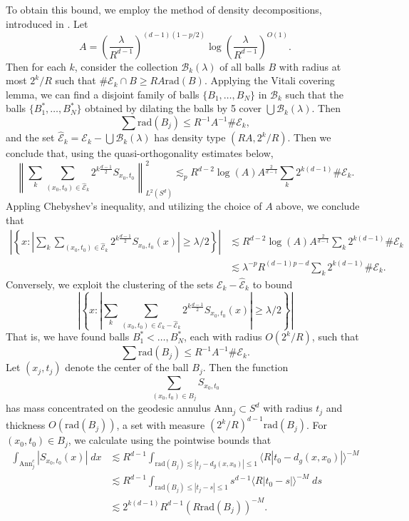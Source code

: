 To obtain this bound, we employ the method of density decompositions, introduced in \cite{HeoandNazarovandSeeger}. Let
%
\[ A = \left( \frac{\lambda}{R^{d-1}} \right)^{(d-1)(1 - p/2)} \log \left( \frac{\lambda}{R^{d-1}} \right)^{O(1)}. \]
%
Then for each $k$, consider the collection $\mathcal{B}_k(\lambda)$ of all balls $B$ with radius at most $2^k / R$ such that $\# \mathcal{E}_k \cap B \geq R A \text{rad}(B)$. Applying the Vitali covering lemma, we can find a disjoint family of balls $\{ B_1, \dots, B_N \}$ in $\mathcal{B}_k$ such that the balls $\{ B_1^*, \dots, B_N^* \}$ obtained by dilating the balls by 5 cover $\bigcup \mathcal{B}_k(\lambda)$. Then
%
\[ \sum \text{rad}(B_j) \leq R^{-1} A^{-1} \# \mathcal{E}_k, \]
%
and the set $\widehat{\mathcal{E}}_k = \mathcal{E}_k - \bigcup \mathcal{B}_k(\lambda)$ has density type $(R A, 2^k / R)$. Then we conclude that, using the quasi-orthogonality estimates below,
%
\[ \left\| \sum_k \sum_{(x_0,t_0) \in \widehat{\mathcal{E}}_k} 2^{k \frac{d-1}{2}} {S\!}_{x_0,t_0} \right\|_{L^2(S^d)}^2 \lesssim_p R^{d-2} \log(A) A^{\frac{2}{d-1}} \sum_k 2^{k(d-1)} \# \mathcal{E}_k. \]
%
Appling Chebyshev's inequality, and utilizing the choice of $A$ above, we conclude that
%
\begin{align*}
    \left| \left\{ x: \left|\sum_k \sum_{(x_0,t_0) \in \widehat{\mathcal{E}}_k} 2^{k \frac{d-1}{2}} {S\!}_{x_0,t_0}(x)\right| \geq \lambda / 2 \right\} \right| &\lesssim R^{d-2} \log(A) A^{\frac{2}{d-1}} \sum_k 2^{k(d-1)} \# \mathcal{E}_k\\
    &\lesssim \lambda^{-p} R^{(d-1)p - d} \sum_k 2^{k(d-1)} \# \mathcal{E}_k.
\end{align*}
% 
Conversely, we exploit the clustering of the sets $\mathcal{E}_k - \widehat{\mathcal{E}}_k$ to bound
%
\[ \left| \left\{ x: \left|\sum_k \sum_{(x_0,t_0) \in \mathcal{E}_k - \widehat{\mathcal{E}}_k} 2^{k \frac{d-1}{2}} {S\!}_{x_0,t_0}(x)\right| \geq \lambda / 2 \right\} \right| \]
%
That is, we have found balls $B_1^*< \dots, B_N^*$, each with radius $O(2^k / R)$, such that
%
\[ \sum \text{rad}(B_j) \leq R^{-1} A^{-1} \# \mathcal{E}_k. \]
%
Let $(x_j,t_j)$ denote the center of the ball $B_j$. Then the function
%
\[ \sum_{(x_0,t_0) \in B_j} {S\!}_{x_0,t_0} \]
%
has mass concentrated on the geodesic annulus $\text{Ann}_j \subset S^d$ with radius $t_j$ and thickness $O( \text{rad}(B_j) )$, a set with measure $(2^k / R)^{d-1} \text{rad}(B_j)$. For $(x_0,t_0) \in B_j$, we calculate using the pointwise bounds that
%
\begin{align*}
    \int_{\text{Ann}_j^c} |{S\!}_{x_0,t_0}(x)|\; dx &\lesssim R^{d-1} \int_{\text{rad}(B_j) \lesssim |t_j - d_g(x,x_0)| \leq 1} \langle R |t_0 - d_g(x,x_0)| \rangle^{-M}\\
    &\lesssim R^{d-1} \int_{\text{rad}(B_j) \leq |t_j - s| \leq 1} s^{d-1} \langle R |t_0 - s| \rangle^{-M}\; ds\\
    &\lesssim 2^{k(d-1)} R^{d-1} ( R \text{rad}(B_j) )^{-M}.
\end{align*}
